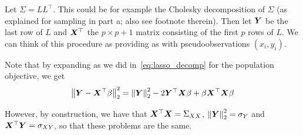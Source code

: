 \begin{enumerate}[label=(\alph*)]
Let $\Sigma = LL^\top$. This could be for example the Cholesky decomposition of $\Sigma$ (as explained for sampling in part a; also see footnote therein). Then let $\bm{Y}$ be the last row of $L$ and $\bm{X}^\top$ the $p \times p+1$ matrix consisting of the first $p$ rows of $L$. We can think of this procedure as providing as with pseudoobservations $(x_i, y_i)$.

Note that by expanding as we did in~\eqref{eq:lasso_decomp} for the population objective, we get
\begin{equation}
\label{eq:sample_lasso_expanded}
 \left\lVert\bm{Y} - \bm{X}^\top \beta\right\rVert^2_2  = \left\lVert\bm{Y}\right\rVert_2^2 -2\bm{Y}^\top \bm{X}\beta + \beta \bm{X}^\top \bm{X}\beta 
\end{equation}

However, by construction, we have that $\bm{X}^\top \bm{X} = \Sigma_{XX}$,  $\left\lVert\bm{Y}\right\rVert_2^2 = \sigma_{Y}$ and $\bm{X}^\top \bm{Y} = \sigma_{XY}$, so that these problems are the same.

\end{enumerate}
